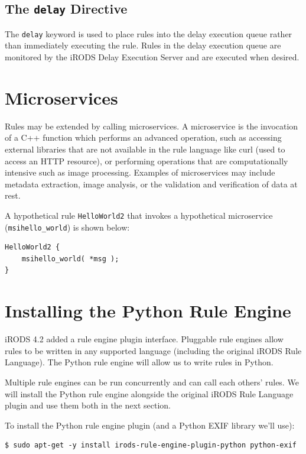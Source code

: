 \documentclass[10pt,oneside]{memoir}
\begin{document}
\subsection{The \texttt{delay} Directive}

The \texttt{delay} keyword is used to place rules into the delay execution queue rather than immediately executing the rule. Rules in the delay execution queue are monitored by the iRODS Delay Execution Server and are executed when desired.

\section{Microservices}

Rules may be extended by calling microservices. A microservice is the invocation of a C++ function which performs an advanced operation, such as accessing external libraries that are not available in the rule language like curl (used to access an HTTP resource), or performing operations that are computationally intensive such as image processing. Examples of microservices may include metadata extraction, image analysis, or the validation and verification of data at rest.

A hypothetical rule \texttt{HelloWorld2} that invokes a hypothetical microservice (\texttt{msihello\_world}) is shown below:

\begin{lstlisting}
HelloWorld2 {
	msihello_world( *msg );
}
\end{lstlisting}


\section{Installing the Python Rule Engine}

iRODS 4.2 added a rule engine plugin interface.  Pluggable rule engines allow rules to be written in any supported language (including the original iRODS Rule Language).  The Python rule engine will allow us to write rules in Python.

Multiple rule engines can be run concurrently and can call each others' rules.  We will install the Python rule engine alongside the original iRODS Rule Language plugin and use them both in the next section.

To install the Python rule engine plugin (and a Python EXIF library we'll use):

\begin{lstlisting}
$ sudo apt-get -y install irods-rule-engine-plugin-python python-exif
\end{lstlisting}
\end{document}
